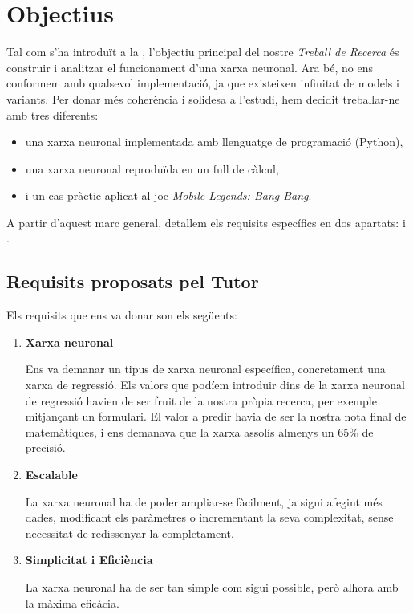 \chapter{Objectius}
\label{c:objectius}

Tal com s’ha introduït a la , l’objectiu principal del nostre \textit{Treball de Recerca} és construir i analitzar el funcionament d’una xarxa neuronal. Ara bé, no ens conformem amb qualsevol implementació, ja que existeixen infinitat de models i variants. Per donar més coherència i solidesa a l’estudi, hem decidit treballar-ne amb tres diferents:

\begin{itemize}
    \item una xarxa neuronal implementada amb llenguatge de programació (Python),
    \item una xarxa neuronal reproduïda en un full de càlcul,
    \item i un cas pràctic aplicat al joc \textit{Mobile Legends: Bang Bang}.
\end{itemize}

A partir d’aquest marc general, detallem els requisits específics en dos apartats:  i .

\section{Requisits proposats pel Tutor}
\label{sec:Requisits proposats pel Tutor}
Els requisits que ens va donar son els següents:
\begin{enumerate}
 \item \textbf{Xarxa neuronal}

 Ens va demanar un tipus de xarxa neuronal específica, concretament una xarxa de regressió. Els valors que podíem introduir dins de la xarxa neuronal de regressió havien de ser fruit de la nostra pròpia recerca, per exemple mitjançant un formulari. El valor a predir havia de ser la nostra nota final de matemàtiques, i ens demanava que la xarxa assolís almenys un 65\% de precisió.

 \item \textbf{Escalable}

 La xarxa neuronal ha de poder ampliar-se fàcilment, ja sigui afegint més dades, modificant els paràmetres o incrementant la seva complexitat, sense necessitat de redissenyar-la completament.

\item \textbf{Simplicitat i Eficiència}

La xarxa neuronal ha de ser tan simple com sigui possible, però alhora amb la màxima eficàcia.

\end{enumerate}


